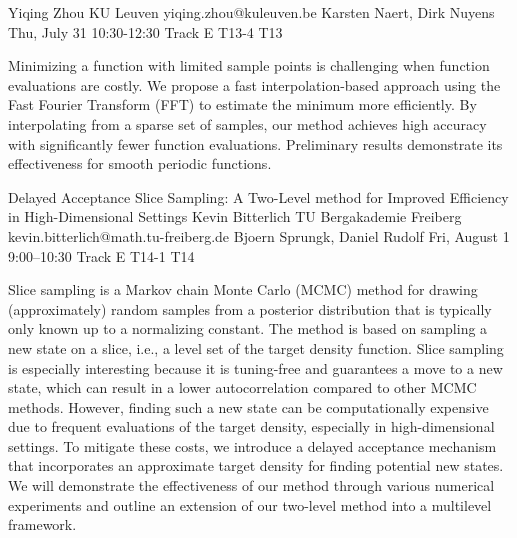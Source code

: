 \begin{talk}
  {Yiqing Zhou}%
  {KU Leuven}%
  {yiqing.zhou@kuleuven.be}%
  {Karsten Naert, Dirk Nuyens}%
  {}%
  {}%
  {Thu, July 31 10:30-12:30 Track E}%
  {T13-4}%
  {T13}%
			
Minimizing a function with limited sample points is challenging when function evaluations are costly. We propose a fast interpolation-based approach using the Fast Fourier Transform (FFT) to estimate the minimum more efficiently. By interpolating from a sparse set of samples, our method achieves high accuracy with significantly fewer function evaluations. Preliminary results demonstrate its effectiveness for smooth periodic functions.
\end{talk}
\begin{talk}
  {Delayed Acceptance Slice Sampling: A Two-Level method for Improved Efficiency in High-Dimensional Settings}%
  {Kevin Bitterlich}%
  {TU Bergakademie Freiberg}%
  {kevin.bitterlich@math.tu-freiberg.de}%
  {Bjoern Sprungk, Daniel Rudolf}%
  {}%
  {Fri, August 1 9:00–10:30 Track E}%
  {T14-1}%
  {T14}%
			
Slice sampling is a Markov chain Monte Carlo (MCMC) method for drawing (approximately) random samples from a posterior distribution that 
is typically only known up to a normalizing constant. 
The method is based on sampling a new state on a slice, i.e., a level set of the target density function. 
Slice sampling is especially interesting because it is tuning-free and guarantees a move to a new state, which can 
result in a lower autocorrelation compared to other MCMC methods. 
However, finding such a new state can be computationally expensive due to frequent evaluations of the target density, 
especially in high-dimensional settings. 
To mitigate these costs, we introduce a delayed acceptance mechanism that incorporates an approximate target density for finding potential 
new states. We will demonstrate the effectiveness of our method through various numerical experiments and outline an extension of our two-level method into a multilevel framework.


\end{talk}
